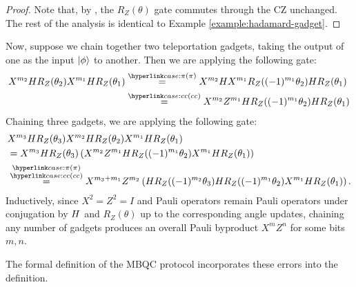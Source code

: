 \begin{proof}
Note that, by , the $R_Z(\theta)$ gate commutes through the CZ unchanged. The rest of the analysis is identical to Example \ref{example:hadamard-gadget}.
\end{proof}

\begin{example}
Now, suppose we chain together two teleportation gadgets, taking the output of one as the input $\ket\phi$ to another. Then we are applying the following gate:
\begin{align}
    X^{m_2} H R_Z(\theta_2) X^{m_1} H R_Z(\theta_1)
    &\overset{\zxref{\pi}}{=}
    X^{m_2} H X^{m_1} R_Z((-1)^{m_1} \theta_2) H R_Z(\theta_1) \\
    &\overset{\zxref{cc}}{=}
    X^{m_2} Z^{m_1} H R_Z((-1)^{m_1} \theta_2) H R_Z(\theta_1)
\end{align}
Chaining three gadgets, we are applying the following gate:
\begin{align}
    &X^{m_3} H R_Z(\theta_3) X^{m_2} H R_Z(\theta_2) X^{m_1} H R_Z(\theta_1) \\
    &= X^{m_3} H R_Z(\theta_3) 
        \left(X^{m_2} Z^{m_1} H R_Z((-1)^{m_1} \theta_2) X^{m_1} H R_Z(\theta_1)\right) \\
    &\overset{\substack{\zxref{\pi}\\\zxref{cc}}}{=}
    X^{m_3 + m_1} Z^{m_2} 
        \left(H R_Z((-1)^{m_2}\theta_3) H R_Z((-1)^{m_1} \theta_2) X^{m_1} H R_Z(\theta_1)\right).
\end{align}
Inductively, since $X^2=Z^2=I$ and Pauli operators remain Pauli operators under conjugation by $H$ and $R_Z(\theta)$ up to the corresponding angle updates, chaining any number of gadgets produces an overall Pauli byproduct $X^mZ^n$ for some bits $m,n$.
\end{example}

The formal definition of the MBQC protocol incorporates these errors into the definition.

